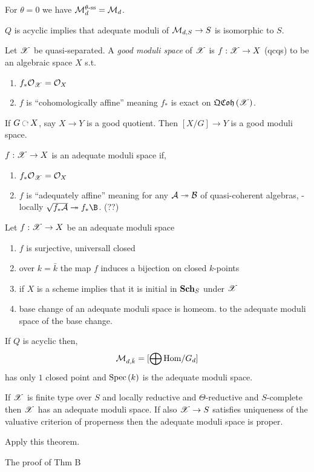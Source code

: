 \documentclass[12pt]{article}
\begin{document}
For $\theta = 0$ we have $\mathcal{M}_d^{\theta\text{-ss}} = \mathcal{M}_d$.

\begin{prop}
$Q$ is acyclic implies that adequate moduli of $\mathcal{M}_{d,S} \to S$ is isomorphic to $S$.
\end{prop}

\begin{defn}
Let $\mathscr{X}$ be quasi-separated. A \textit{good moduli space} of $\mathscr{X}$ is $f : \mathscr{X} \to X$ (qcqs) to be an algebraic space $X$ s.t.
\begin{enumerate}
\item $f_* \mathcal{O}_{\mathscr{X}} = \mathcal{O}_{X}$
\item $f$ is ``cohomologically affine'' meaning $f_*$ is exact on $\mathfrak{QCoh}\left(\mathscr{X}\right)$.
\end{enumerate}
\end{defn}

\begin{example}
If $G \acts X$, say $X \to Y$ is a good quotient. Then $[X/G] \to Y$ is a good moduli space.
\end{example}

\begin{defn}
$f : \mathscr{X} \to X$ is an adequate moduli space if,
\begin{enumerate}
\item $f_* \mathcal{O}_{\mathscr{X}} = \mathcal{O}_{X}$
\item $f$ is ``adequately affine'' meaning for any $\mathcal{A} \twoheadrightarrow \mathcal{B}$ of quasi-coherent algebras, \etale-locally $\sqrt{f_* \cA} \onto f_* \B$. (??)
\end{enumerate}
\end{defn}

\begin{theorem}[Alper]
Let $f : \mathscr{X} \to X$ be an adequate moduli space
\begin{enumerate}
\item $f$ is surjective, universall closed
\item over $k = \bar{k}$ the map $f$ induces a bijection on closed $k$-points
\item if $X$ is a scheme implies that it is initial in $\mathbf{Sch}_S$ under $\mathscr{X}$
\item base change of an adequate moduli space is homeom. to the adequate moduli space of the base change. 
\end{enumerate}
\end{theorem}

\begin{example}
If $Q$ is acyclic then,
\[ \mathcal{M}_{d, \bar{k}} = [ \bigoplus \mathrm{Hom} / G_d] \]
has only $1$ closed point and $\mathrm{Spec}\left( k \right)$ is the adequate moduli space. 
\end{example}

\begin{theorem}[Alper]
If $\mathscr{X}$ is finite type over $S$ and locally reductive and $\Theta$-reductive and $S$-complete then $\mathscr{X}$ has an adequate moduli space. If also $\mathscr{X} \to S$ satisfies uniqueness of the valuative criterion of properness then the adequate moduli space is proper. 
\end{theorem}

Apply this theorem.

The proof of Thm B
\end{document}
